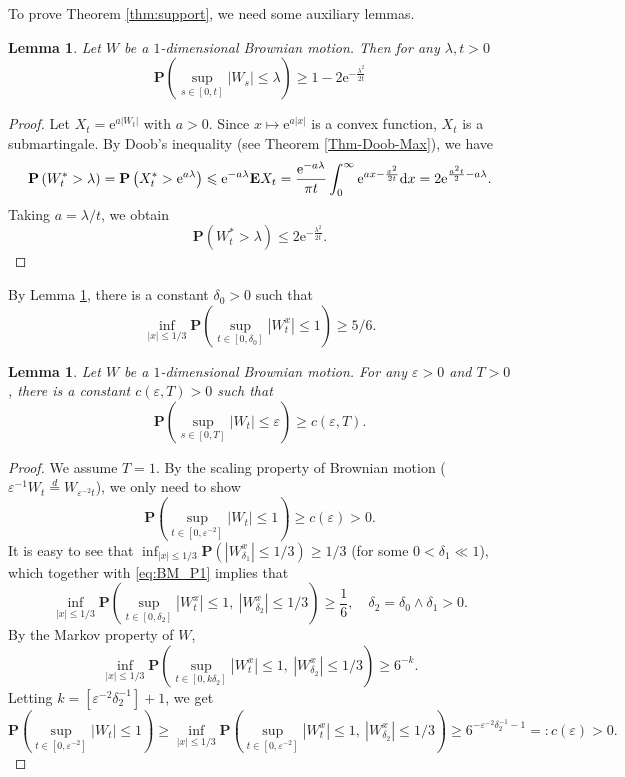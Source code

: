 \documentclass[twoside, 12pt]{book}
\numberwithin{equation}{chapter}
\newtheorem{lemma}[theorem]{Lemma}
\def\bE{{\mathbf E}}
\def\bP{{\mathbf P}}
\def\l{\left}
\def\r{\right}
\def\geq{\geqslant}
\def\leq{\leqslant}
\def\d{\text{\rm{d}}}
\def\e{\mathrm{e}}
\def\eps{\varepsilon}
\begin{document}
	To prove Theorem \ref{thm:support}, we need some  auxiliary lemmas. 
	\begin{lemma}\label{lem:BM_P1}
		Let $W$ be a $1$-dimensional Brownian motion. Then for any $\lambda, t>0$ 
		\begin{equation*}
			\bP \l(\sup_{s\in [0,t]}|W_s|\leq \lambda\r) \geq 1-2\e^{-\frac{\lambda^2}{2t}}
		\end{equation*}
	\end{lemma}
	\begin{proof}
		Let $X_t= \e^{a|W_t|}$ with $a>0$. Since $x\mapsto \e^{a|x|}$ is a convex function, $X_t$ is a submartingale. By Doob's inequality (see Theorem \ref{Thm-Doob-Max}), we have 
		\begin{align*}
			\bP \l(W^*_t>\lambda \r)= \bP \l(X^*_t>\e^{a\lambda}\r)\leq \e^{-a\lambda} \bE X_t = \frac{\e^{-a \lambda} }{\pi t} \int_{0}^\infty \e^{a x-\frac{x^2}{2t}} \d x = 2\e^{\frac{a^2 t}{2}-a\lambda}.
		\end{align*}
		Taking $a=\lambda/t$, we obtain 
		\[
		\bP \l(W^*_t>\lambda \r) \leq 2 \e^{-\frac{\lambda^2}{2t}}. 
		\]
	\end{proof}
	By Lemma \ref{lem:BM_P1}, there is a constant $\delta_0>0$ such that 
	\begin{equation}\label{eq:BM_P1}
		\inf_{|x|\leq 1/3} \bP\l(\sup_{t\in [0,\delta_0]} |W^x_t|\leq 1\r)\geq 5/6. 
	\end{equation}
	\begin{lemma}\label{lem:BM_P2}
		Let $W$ be a $1$-dimensional Brownian motion. For any $\eps>0$ and $T>0$, there is a constant $c(\eps, T)>0$ such that 
		\[
		\bP \l(\sup_{s\in [0,T]}|W_t| \leq \eps\r) \geq c(\eps, T). 
		\]
	\end{lemma}
	\begin{proof}
		We assume $T=1$. By the scaling property of Brownian motion ($\eps^{-1}W_t\overset{d}{=} W_{\eps^{-2}t}$), we only need to show 
		\[
		\bP \l(\sup_{t\in[0,\eps^{-2}]} |W_t|\leq 1 \r)\geq c(\eps)>0. 
		\]
		It is easy to see that $\inf_{|x|\leq 1/3} \bP (|W^x_{\delta_1}|\leq 1/3)\geq 1/3$ (for some $0<\delta_1\ll 1$), which together with \eqref{eq:BM_P1} implies that 
		\[
		\inf_{|x|\leq 1/3} \bP\l( \sup_{t\in [0,\delta_2]} |W_t^x|\leq 1, ~ |W_{\delta_2}^x| \leq 1/3\r) 
		\geq \frac{1}{6}, \quad \delta_2=\delta_0\wedge \delta_1>0.  
		\]
		By the Markov property of $W$, 
		\[
		\inf_{|x|\leq 1/3} \bP\l( \sup_{t\in [0, k\delta_2]} |W_t^x|\leq 1, ~ |W_{\delta_2}^x| \leq 1/3\r) 
		\geq 6^{-k}. 
		\]	
		Letting $k=[\eps^{-2}\delta_2^{-1}]+1$, we get  
		\[
		\bP\l( \sup_{t\in [0, \eps^{-2}]} |W_t|\leq 1 \r)\geq \inf_{|x|\leq 1/3} \bP\l( \sup_{t\in [0, \eps^{-2}]} |W_t^x|\leq 1, ~ |W_{\delta_2}^x| \leq 1/3\r) 
		\geq 6^{-\eps^{-2}\delta_2^{-1}-1}=: c(\eps)>0. 
		\]	
	\end{proof}
\end{document}
